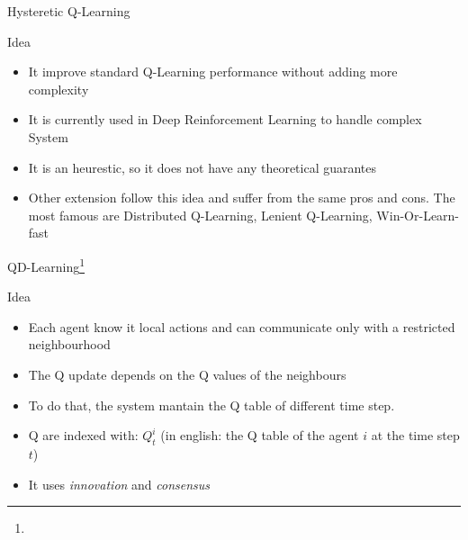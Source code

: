 \documentclass[presentation]{beamer}\mode<presentation>{\usetheme{AMSBolognaFC}}
\begin{document}
\begin{frame}{Hysteretic Q-Learning}
	\begin{exampleblock}{Idea}
		\begin{itemize}{}
			\item[{\color{teal} \faThumbsUp}] It improve standard Q-Learning performance without adding more complexity
			\item[{\color{teal} \faThumbsUp}] It is currently used in Deep Reinforcement Learning to handle complex System
			\item[{\color{red} \faThumbsDown}] It is an heurestic, so it does not have any theoretical guarantes
			\item Other extension follow this idea and suffer from the same pros and cons. The most famous are Distributed Q-Learning, Lenient Q-Learning, Win-Or-Learn-fast
		\end{itemize}
	\end{exampleblock}
\end{frame}
\begin{frame}{QD-Learning\footnote[frame]{}}
	\begin{exampleblock}{Idea}
		\begin{itemize}
			\item Each agent know it local actions and can communicate only with a restricted neighbourhood
			\item The Q update depends on the Q values of the neighbours
			\item To do that, the system mantain the Q table of different time step.
			\item Q are indexed with: $Q^i_t$ (in english: the Q table of the agent $i$ at the time step $t$)
			\item It uses \emph{innovation} and \emph{consensus}
			
		\end{itemize}		
	\end{exampleblock}
\end{frame}
\end{document}
